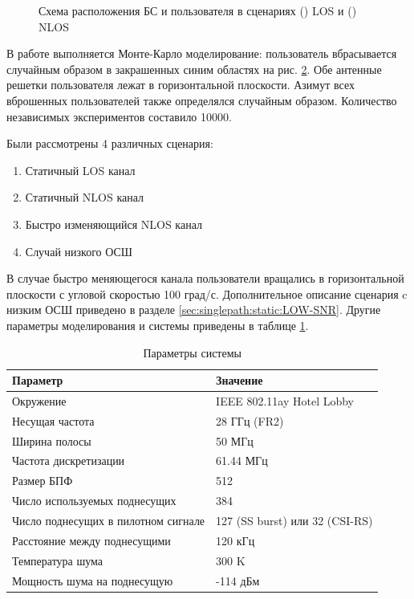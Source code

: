 \begin{figure}[ht]
\begin{subfigure}{0.49\linewidth}
    \caption{}
    \label{fig:4.30b}
  \end{subfigure}
  \caption{Схема расположения БС и пользователя в сценариях () LOS
    и () NLOS}
  \label{fig:4.30}
\end{figure}



В работе выполняется  Монте-Карло моделирование: пользователь вбрасывается
случайным образом в закрашенных синим областях на рис. \ref{fig:4.30}.
Обе антенные решетки пользователя лежат в горизонтальной плоскости.
Азимут всех вброшенных пользователей также определялся случайным образом.
Количество независимых экспериментов составило 10000.

Были рассмотрены 4 различных сценария:
\begin{enumerate}
  \item Статичный LOS канал
  \item Статичный NLOS канал
  \item Быстро изменяющийся NLOS канал
  \item Случай низкого ОСШ
\end{enumerate}

В случае быстро меняющегося канала пользователи вращались в горизонтальной
плоскости с угловой скоростью 100 град/с. Дополнительное описание
сценария c низким ОСШ приведено в разделе \ref{sec:singlepath:static:LOW-SNR}.
Другие параметры моделирования и системы приведены в таблице \ref{tab:4.10}.

\begin{table}
  \centering
  \caption{Параметры системы}
  \label{tab:4.10}
  \begin{tabular}{ll}
    \toprule
    \textbf{Параметр}                   & \textbf{Значение}              \\
    \midrule
    Окружение                           & IEEE 802.11ay Hotel Lobby      \\
    Несущая частота                     & 28 ГГц (FR2)                   \\
    Ширина полосы                       & 50 МГц                         \\
    Частота дискретизации               & 61.44 МГц                      \\
    Размер БПФ                          & 512                            \\
    Число используемых поднесущих       & 384                            \\
    Число поднесущих в пилотном сигнале & 127 (SS burst) или 32 (CSI-RS) \\
    Расстояние между поднесущими        & 120 кГц                        \\
    Температура шума                    & 300 K                          \\
    Мощность шума на поднесущую         & -114 дБм                       \\
    \bottomrule
  \end{tabular}
\end{table}

